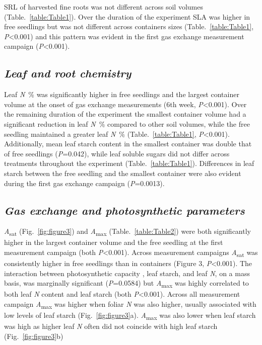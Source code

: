\documentclass[a4paper]{article}\usepackage[]{graphicx}\usepackage[]{color}
\begin{document}
SRL of harvested fine roots was not different across soil volumes (Table.~\ref{table:Table1}). Over the duration of the experiment SLA was higher in free seedlings but was not different across containers sizes (Table.~\ref{table:Table1}, \textit{P}\textless0.001) and this pattern was evident in the first gas exchange measurement campaign (\textit{P}\textless0.001).

\subsection*{\textit{Leaf and root chemistry}}
Leaf \textit{N}~\% was significantly higher in free seedlings and the largest container volume at the onset of gas exchange measurements (6th week, \textit{P}\textless0.001).  Over the remaining duration of the experiment the smallest container volume had a significant reduction in leaf \textit{N}~\% compared to other soil volumes, while the free seedling maintained a greater leaf \textit{N}~\% (Table.~\ref{table:Table1}, \textit{P}\textless0.001).  Additionally, mean leaf starch content in the smallest container was double that of free seedlings (\textit{P}=0.042), while leaf soluble sugars did not differ across treatments throughout the experiment (Table.~\ref{table:Table1}).  Differences in leaf starch between the free seedling and the smallest container were also evident during the first gas exchange campaign (\textit{P}=0.0013). 

\subsection*{\textit{Gas exchange and photosynthetic parameters}}
\textit{A}\textsubscript{sat} (Fig.~\ref{fig:figure3}) and \textit{A}\textsubscript{max} (Table.~\ref{table:Table2}) were both significantly higher in the largest container volume and the free seedling at the first measurement campaign (both \textit{P}\textless0.001). Across measurement campaigns \textit{A}\textsubscript{sat} was consistently higher in free seedlings than in containers (Figure 3, \textit{P}\textless0.001). The interaction between photosynthetic capacity , leaf starch, and leaf \textit{N}, on a mass basis, was marginally significant (\textit{P}=0.0584) but \textit{A}\textsubscript{max} was highly correlated to both leaf \textit{N} content and leaf starch (both \textit{P}\textless0.001). Across all measurement campaign \textit{A}\textsubscript{max} was higher when foliar \textit{N} was also higher, usually associated with low levels of leaf starch (Fig.~\ref{fig:figure3}a). \textit{A}\textsubscript{max} was also lower when leaf starch was high as higher leaf \textit{N} often did not coincide with high leaf starch (Fig.~\ref{fig:figure3}b)
\end{document}
